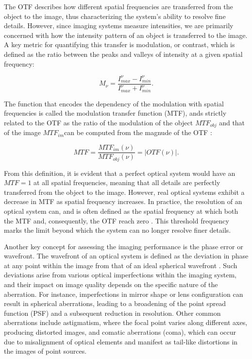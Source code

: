 The OTF describes how different spatial frequencies are transferred from the object to the image, thus characterizing the system's ability to resolve fine details. However, since imaging systems measure intensities, we are primarily concerned with how the intensity pattern of an object is transferred to the image. A key metric for quantifying this transfer is modulation, or contrast, which is defined as the ratio between the peaks and valleys of intensity at a given spatial frequency:

\begin{equation}
  M _ {\nu} = \frac{I_{max} ^{\nu} - I_{min} ^{\nu}}{I_{max} ^{\nu} + I_{min} ^{\nu}}.
\end{equation}

The function that encodes the dependency of the modulation with spatial frequencies is called the modulation transfer function (MTF), ands strictly related to the OTF as the ratio of the modulation of the object $MTF_{obj}$ and that of the image $MTF_{im} $can be computed from the magnude of the OTF \citep{OTF}:

\begin{equation}
  MTF = \frac{MTF_{im}(\nu)}{MTF_{obj}(\nu)} = | OTF(\nu) |.
\end{equation}

From this definition, it is evident that a perfect optical system would have an $MTF=1$ at all spatial frequencies, meaning that all details are perfectly transferred from the object to the image. However, real optical systems exhibit a decrease in MTF as spatial frequency increases. In practice, the resolution of an optical system can, and is often defined as the spatial frequency at which both the MTF and, consequently, the OTF reach zero \citep{wfes}. This threshold frequency marks the limit beyond which the system can no longer resolve finer details. 

Another key concept for assessing the imaging performance is the phase error or wavefront. The wavefront of an optical system is defined as the deviation in phase at any point within the image from that of an ideal spherical wavefront \citep{WFE_def}. Such deviations arise from various optical imperfections within the imaging system, and their impact on image quality depends on the specific nature of the aberration. For instance, imperfections in mirror shape or lens configuration can result in spherical aberrations, leading to a broadening of the point spread function (PSF) and a subsequent reduction in resolution. Other common aberrations include astigmatism, where the focal point varies along different axes, producing distorted images, and comatic aberrations (coma), which can occur due to misalignment of optical elements and manifest as tail-like distortions in the images of point sources.

